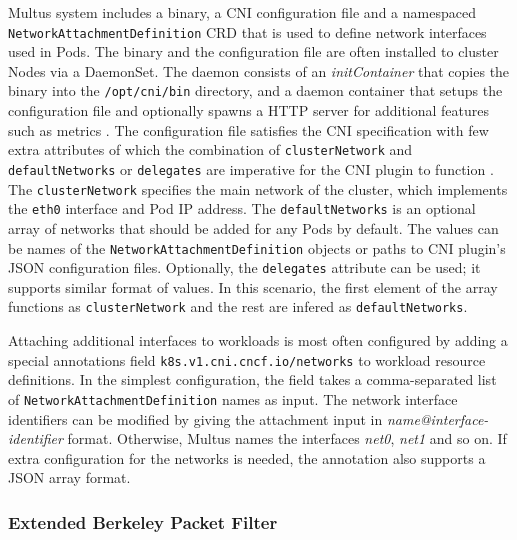 \documentclass[english, 12pt, a4paper, sci, utf8, a-2b, online]{aaltothesis}
\begin{document}
Multus system includes a binary, a CNI configuration file and a namespaced \texttt{NetworkAttachmentDefinition} CRD that is used to define network interfaces used in Pods. The binary and the configuration file are often installed to cluster Nodes via a DaemonSet. The daemon consists of an \textit{initContainer} that copies the binary into the \texttt{/opt/cni/bin} directory, and a daemon container that setups the configuration file and optionally spawns a HTTP server for additional features such as metrics \cite{multus-cni}. The configuration file satisfies the CNI specification with few extra attributes of which the combination of \texttt{clusterNetwork} and \texttt{defaultNetworks} or \texttt{delegates} are imperative for the CNI plugin to function \cite{multus-cni-config}. The \texttt{clusterNetwork} specifies the main network of the cluster, which implements the \texttt{eth0} interface and Pod IP address. The \texttt{defaultNetworks} is an optional array of networks that should be added for any Pods by default. The values can be names of the \texttt{NetworkAttachmentDefinition} objects or paths to CNI plugin's JSON configuration files. Optionally, the \texttt{delegates} attribute can be used; it supports similar format of values. In this scenario, the first element of the array functions as \texttt{clusterNetwork} and the rest are infered as \texttt{defaultNetworks}.


Attaching additional interfaces to workloads is most often configured by adding a special annotations field \texttt{k8s.v1.cni.cncf.io/networks} to workload resource definitions. In the simplest configuration, the field takes a comma-separated list of \texttt{NetworkAttachmentDefinition} names as input. The network interface identifiers can be modified by giving the attachment input in \textit{name@interface-identifier} format. Otherwise, Multus names the interfaces \textit{net0}, \textit{net1} and so on. If extra configuration for the networks is needed, the annotation also supports a JSON array format.

\subsubsection{Extended Berkeley Packet Filter}
\end{document}
